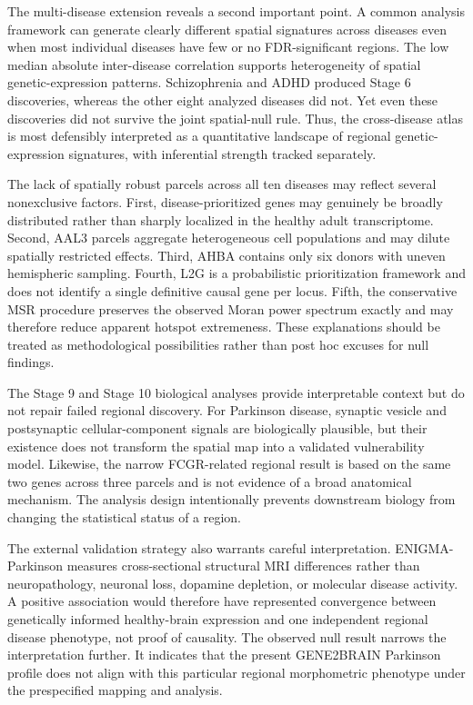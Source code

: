 \documentclass[10pt,twocolumn]{article}
\begin{document}
The multi-disease extension reveals a second important point. A common analysis framework can generate clearly different spatial signatures across diseases even when most individual diseases have few or no FDR-significant regions. The low median absolute inter-disease correlation supports heterogeneity of spatial genetic-expression patterns. Schizophrenia and ADHD produced Stage 6 discoveries, whereas the other eight analyzed diseases did not. Yet even these discoveries did not survive the joint spatial-null rule. Thus, the cross-disease atlas is most defensibly interpreted as a quantitative landscape of regional genetic-expression signatures, with inferential strength tracked separately.

The lack of spatially robust parcels across all ten diseases may reflect several nonexclusive factors. First, disease-prioritized genes may genuinely be broadly distributed rather than sharply localized in the healthy adult transcriptome. Second, AAL3 parcels aggregate heterogeneous cell populations and may dilute spatially restricted effects. Third, AHBA contains only six donors with uneven hemispheric sampling. Fourth, L2G is a probabilistic prioritization framework and does not identify a single definitive causal gene per locus. Fifth, the conservative MSR procedure preserves the observed Moran power spectrum exactly and may therefore reduce apparent hotspot extremeness. These explanations should be treated as methodological possibilities rather than post hoc excuses for null findings.

The Stage 9 and Stage 10 biological analyses provide interpretable context but do not repair failed regional discovery. For Parkinson disease, synaptic vesicle and postsynaptic cellular-component signals are biologically plausible, but their existence does not transform the spatial map into a validated vulnerability model. Likewise, the narrow FCGR-related regional result is based on the same two genes across three parcels and is not evidence of a broad anatomical mechanism. The analysis design intentionally prevents downstream biology from changing the statistical status of a region.

The external validation strategy also warrants careful interpretation. ENIGMA-Parkinson measures cross-sectional structural MRI differences rather than neuropathology, neuronal loss, dopamine depletion, or molecular disease activity. A positive association would therefore have represented convergence between genetically informed healthy-brain expression and one independent regional disease phenotype, not proof of causality. The observed null result narrows the interpretation further. It indicates that the present GENE2BRAIN Parkinson profile does not align with this particular regional morphometric phenotype under the prespecified mapping and analysis.
\end{document}
